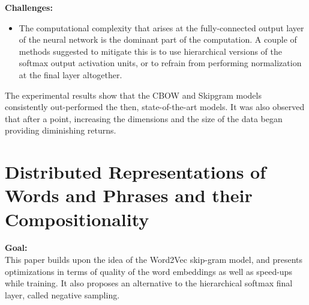 \documentclass[11pt,a4paper]{article}
\begin{document}
  \textbf{Challenges:}
  \begin{itemize}
    \item 
    The computational complexity that arises at the fully-connected output layer of the neural network is the dominant part of the computation. A couple of methods suggested to mitigate this is to use hierarchical versions of the softmax output activation units, or to refrain from performing normalization at the final layer altogether.
  \end{itemize}

  The experimental results show that the CBOW and Skipgram models consistently out-performed the then, state-of-the-art models. It was also observed that after a point, increasing the dimensions and the size of the data began providing diminishing returns.



\section{Distributed Representations of Words and Phrases and their Compositionality} %
\label{sec:distributed_representations_of_words_and_phrases_and_their_compositionality}

  \textbf{Goal:}\\
  This paper builds upon the idea of the Word2Vec skip-gram model, and presents optimizations in terms of quality of the word embeddings as well as speed-ups while training. It also proposes an alternative to the hierarchical softmax final layer, called negative sampling.\\
\end{document}
